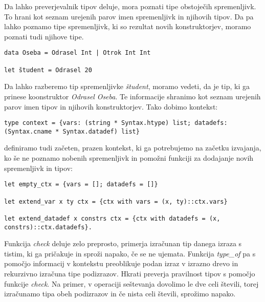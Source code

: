 \documentclass[12pt,a4paper,openany]{book}
\begin{document}
 Da lahko preverjevalnik tipov deluje, mora poznati tipe obstoječih spremenljivk. To hrani kot seznam urejenih parov imen spremenljivk in njihovih tipov. Da pa lahko poznamo tipe spremenljivk, 
 ki so rezultat novih konstruktorjev, moramo poznati tudi njihove tipe.
 \begin{lstlisting}
data Oseba = Odrasel Int | Otrok Int Int

let študent = Odrasel 20
\end{lstlisting}
Da lahko razberemo tip spremenljivke \emph{študent}, moramo vedeti, da je tip, ki ga prinese koonstruktor \emph{Odrasel} \emph{Oseba}. Te informacije shranimo kot seznam urejenih parov imen 
tipov in njihovih konstruktorjev. Tako dobimo kontekst:
\begin{lstlisting}
type context = {vars: (string * Syntax.htype) list; datadefs: (Syntax.cname * Syntax.datadef) list}
\end{lstlisting}
definiramo tudi začeten, prazen kontekst, ki ga potrebujemo na začetku izvajanja, ko še ne poznamo nobenih spremenljivk in pomožni funkciji za dodajanje novih spremenljivk in tipov:
\begin{lstlisting}
let empty_ctx = {vars = []; datadefs = []}

let extend_var x ty ctx = {ctx with vars = (x, ty)::ctx.vars}

let extend_datadef x constrs ctx = {ctx with datadefs = (x, constrs)::ctx.datadefs}.
\end{lstlisting}

Funkcija \emph{check} deluje zelo preprosto, primerja izračunan tip danega izraza s tistim, ki ga pričakuje in sproži napako, če se ne ujemata. Funkcija \emph{type\_of} pa s pomočjo informacij 
v kontekstu preoblikuje podan izraz v izrazno drevo in rekurzivno izračuna tipe podizrazov. Hkrati preverja pravilnost tipov s pomočjo funkcije \emph{check}. Na primer, v operaciji seštevanja 
dovolimo le dve celi števili, torej izračunamo tipa obeh podizrazov in če nista celi števili, sprožimo napako.
\end{document}
